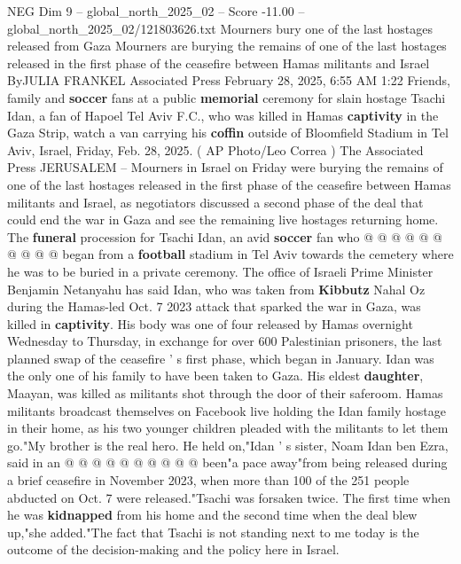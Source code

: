 \begin{textsample}{NEG Dim 9 – global\_north\_2025\_02 – Score -11.00 – global\_north\_2025\_02/121803626.txt}  \label{ex:f9_neg_052}
Mourners bury one of the last hostages released from Gaza Mourners are burying the remains of one of the last hostages released in the first phase of the ceasefire between Hamas militants and Israel ByJULIA FRANKEL Associated Press February 28, 2025, 6:55 AM 1:22 Friends, family and \textbf{soccer} fans at a public \textbf{memorial} ceremony for slain hostage Tsachi Idan, a fan of Hapoel Tel Aviv F.C., who was killed in Hamas \textbf{captivity} in the Gaza Strip, watch a van carrying his \textbf{coffin} outside of Bloomfield Stadium in Tel Aviv, Israel, Friday, Feb. 28, 2025. ( AP Photo/Leo Correa ) The Associated Press JERUSALEM -- Mourners in Israel on Friday were burying the remains of one of the last hostages released in the first phase of the ceasefire between Hamas militants and Israel, as negotiators discussed a second phase of the deal that could end the war in Gaza and see the remaining live hostages returning home.
The \textbf{funeral} procession for Tsachi Idan, an avid \textbf{soccer} fan who @ @ @ @ @ @ @ @ @ @ began from a \textbf{football} stadium in Tel Aviv towards the cemetery where he was to be buried in a private ceremony.
The office of Israeli Prime Minister Benjamin Netanyahu has said Idan, who was taken from \textbf{Kibbutz} Nahal Oz during the Hamas-led Oct. 7 2023 attack that sparked the war in Gaza, was killed in \textbf{captivity}.
His body was one of four released by Hamas overnight Wednesday to Thursday, in exchange for over 600 Palestinian prisoners, the last planned swap of the ceasefire ' s first phase, which began in January.
Idan was the only one of his family to have been taken to Gaza.
His eldest \textbf{daughter}, Maayan, was killed as militants shot through the door of their saferoom.
Hamas militants broadcast themselves on Facebook live holding the Idan family hostage in their home, as his two younger children pleaded with the militants to let them go."My brother is the real hero.
He held on,"Idan ' s sister, Noam Idan ben Ezra, said in an @ @ @ @ @ @ @ @ @ @ been"a pace away"from being released during a brief ceasefire in November 2023, when more than 100 of the 251 people abducted on Oct. 7 were released."Tsachi was forsaken twice.
The first time when he was \textbf{kidnapped} from his home and the second time when the deal blew up,"she added."The fact that Tsachi is not standing next to me today is the outcome of the decision-making and the policy here in Israel.

\end{textsample}
